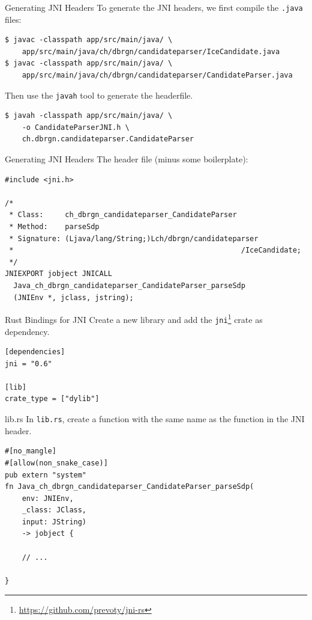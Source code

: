 \documentclass[aspectratio=1610,14pt,t]{beamer}
\begin{document}
\begin{frame}[c,fragile]{Generating JNI Headers}
  To generate the JNI headers, we first compile the \texttt{.java} files:

  \begin{verbatim}
$ javac -classpath app/src/main/java/ \
    app/src/main/java/ch/dbrgn/candidateparser/IceCandidate.java
$ javac -classpath app/src/main/java/ \
    app/src/main/java/ch/dbrgn/candidateparser/CandidateParser.java
  \end{verbatim}

  Then use the \texttt{javah} tool to generate the headerfile.

  \begin{verbatim}
$ javah -classpath app/src/main/java/ \
    -o CandidateParserJNI.h \
    ch.dbrgn.candidateparser.CandidateParser
  \end{verbatim}
\end{frame}

\begin{frame}[c,fragile]{Generating JNI Headers}
  The header file (minus some boilerplate):
  \begin{verbatim}
#include <jni.h>

/*
 * Class:     ch_dbrgn_candidateparser_CandidateParser
 * Method:    parseSdp
 * Signature: (Ljava/lang/String;)Lch/dbrgn/candidateparser
 *                                                     /IceCandidate;
 */
JNIEXPORT jobject JNICALL
  Java_ch_dbrgn_candidateparser_CandidateParser_parseSdp
  (JNIEnv *, jclass, jstring);
  \end{verbatim}

\end{frame}

\begin{frame}[c,fragile]{Rust Bindings for JNI}
  Create a new library and add the
  \texttt{jni}\footnote{\url{https://github.com/prevoty/jni-rs}} crate as
  dependency.

  \begin{verbatim}
[dependencies]
jni = "0.6"

[lib]
crate_type = ["dylib"]
  \end{verbatim}

\end{frame}

\begin{frame}[c,fragile]{lib.rs}
  In \texttt{lib.rs}, create a function with the same name as the function in
  the JNI header.

  \begin{verbatim}
#[no_mangle]
#[allow(non_snake_case)]
pub extern "system"
fn Java_ch_dbrgn_candidateparser_CandidateParser_parseSdp(
    env: JNIEnv,
    _class: JClass,
    input: JString)
    -> jobject {

    // ...

}
  \end{verbatim}

\end{frame}
\end{document}
